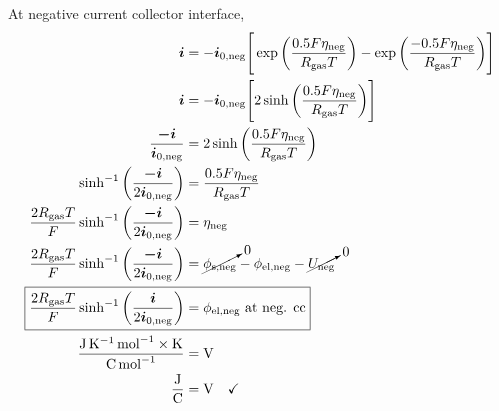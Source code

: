 \documentclass{article}
\begin{document}
At negative current collector interface,
\begin{align}
    \bm{i}                                                                            & = -\bm{i_\text{0,neg}}\Bigg[\exp\bigg(\frac{0.5 F \eta_\text{neg}}{R_\text{gas} T}\bigg) - \exp\bigg(\frac{-0.5 F \eta_\text{neg}}{R_\text{gas} T}\bigg)\Bigg] \\
    \bm{i}                                                                            & = -\bm{i_\text{0,neg}}\Bigg[2 \sinh\bigg(\frac{0.5 F \eta_\text{neg}}{R_\text{gas} T}\bigg) \Bigg]                                                             \\
    \frac{\bm{-i}}{\bm{i_\text{0,neg}}}                                                    & = 2 \sinh\bigg(\frac{0.5 F \eta_\text{neg}}{R_\text{gas} T}\bigg)                                                                                         \\
    \sinh^{-1}\bigg(\frac{\bm{-i}}{2 \bm{i_\text{0,neg}}}\bigg)                            & = \frac{0.5 F \eta_\text{neg}}{R_\text{gas} T}                                                                                                            \\
    \frac{2 R_\text{gas} T}{F} \sinh^{-1}\bigg(\frac{\bm{-i}}{2 \bm{i_\text{0,neg}}}\bigg) & = \eta_\text{neg}                                                                                                                                         \\
    \frac{2 R_\text{gas} T}{F} \sinh^{-1}\bigg(\frac{\bm{-i}}{2 \bm{i_\text{0,neg}}}\bigg) & = \cancelto{0}{\phi_\text{s,neg}} - \phi_\text{el,neg} - \cancelto{0}{U_\text{neg}}                                                                       \\
    \Aboxed{\frac{2 R_\text{gas} T}{F} \sinh^{-1}\bigg(\frac{\bm{i}}{2 \bm{i_\text{0,neg}}}\bigg)  & = \phi_\text{el,neg} \text{ at neg. cc}} \\
    \frac{\si{\joule \per \kelvin \per \mole} \times \si{\kelvin}}{\si{\coulomb\per\mole}} & = \si{\volt} \\
    \frac{\si{\joule}  }{\si{\coulomb}}& = \si{\volt} \quad \checkmark \label{eq:phielnegcc_dimcheck}
\end{align}
\end{document}
